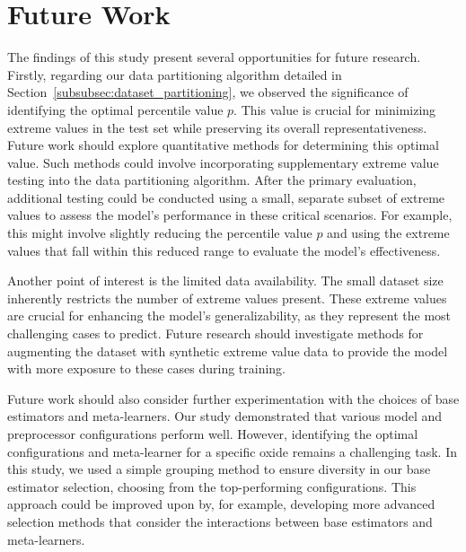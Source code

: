 \section{Future Work}\label{sec:future_work}
The findings of this study present several opportunities for future research.
Firstly, regarding our data partitioning algorithm detailed in Section~\ref{subsubsec:dataset_partitioning}, we observed the significance of identifying the optimal percentile value $p$. 
This value is crucial for minimizing extreme values in the test set while preserving its overall representativeness.
Future work should explore quantitative methods for determining this optimal value.
Such methods could involve incorporating supplementary extreme value testing into the data partitioning algorithm. 
After the primary evaluation, additional testing could be conducted using a small, separate subset of extreme values to assess the model's performance in these critical scenarios.
For example, this might involve slightly reducing the percentile value $p$ and using the extreme values that fall within this reduced range to evaluate the model's effectiveness.

Another point of interest is the limited data availability.
The small dataset size inherently restricts the number of extreme values present.
These extreme values are crucial for enhancing the model's generalizability, as they represent the most challenging cases to predict.
Future research should investigate methods for augmenting the dataset with synthetic extreme value data to provide the model with more exposure to these cases during training.

Future work should also consider further experimentation with the choices of base estimators and meta-learners.
Our study demonstrated that various model and preprocessor configurations perform well.
However, identifying the optimal configurations and meta-learner for a specific oxide remains a challenging task.
In this study, we used a simple grouping method to ensure diversity in our base estimator selection, choosing from the top-performing configurations.
This approach could be improved upon by, for example, developing more advanced selection methods that consider the interactions between base estimators and meta-learners.